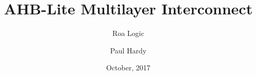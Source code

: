 
\usepackage{pkg/roalogictitle}



\title{AHB-Lite Multilayer Interconnect}
\author{Roa Logic}
\date{October, 2017}
\author{Paul Hardy}

 
\pagestyle{fancy}
\fancyhf{}



\fancyhead[L]{\thepage}
